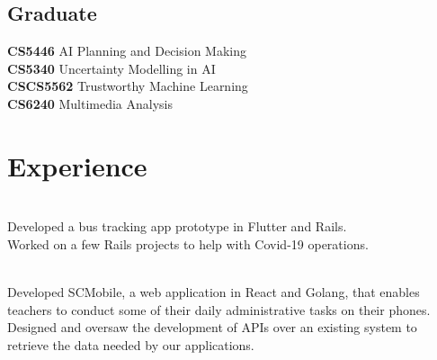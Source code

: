 \documentclass[]{deedy-resume-openfont}
\begin{document}
\begin{minipage}[t]{0.25\textwidth}
\subsection{Graduate}
\textbf{CS5446} AI Planning and Decision Making \\
\textbf{CS5340} Uncertainty Modelling in AI \\
\textbf{CSCS5562} Trustworthy Machine Learning \\
\textbf{CS6240} Multimedia Analysis \\

%
%


\end{minipage}
\hfill
\begin{minipage}[t]{0.66\textwidth}



\section{Experience}

\\
Developed a bus tracking app prototype in Flutter and Rails.\\
Worked on a few Rails projects to help with Covid-19 operations.

\sectionsep
{}\\
Developed SCMobile, a web application in React and Golang, that enables teachers to conduct some of their daily administrative tasks on their phones. \\
Designed and oversaw the development of APIs over an existing system to retrieve the data needed by our applications.

\sectionsep

\\

\sectionsep


\end{minipage}
\end{document}

